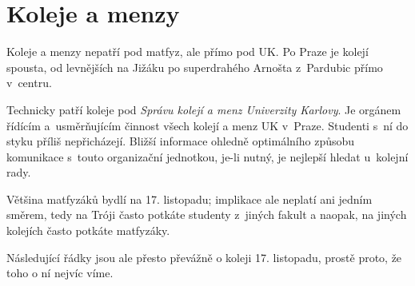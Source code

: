 \section{Koleje a menzy}
Koleje a menzy nepatří pod matfyz, ale přímo pod UK. Po Praze je kolejí spousta, od levnějších na Jižáku po superdrahého Arnošta z~Pardubic přímo v~centru.


Technicky patří koleje pod {\it Správu kolejí a menz Univerzity Karlovy}. Je orgánem řídícím
a~usměrňujícím činnost všech kolejí a menz UK v~Praze. Studenti
s~ní do styku příliš nepřicházejí. Bližší informace ohledně
optimálního způsobu komunikace s~touto organizační jednotkou,
je-li nutný, je nejlepší hledat u~kolejní rady.

Většina matfyzáků bydlí na 17. listopadu; implikace ale neplatí ani jedním směrem, tedy na Tróji často potkáte studenty z~jiných fakult a naopak, na jiných kolejích často potkáte matfyzáky.

Následující řádky jsou ale přesto převážně o koleji 17. listopadu, prostě proto, že toho o ní nejvíc víme.
